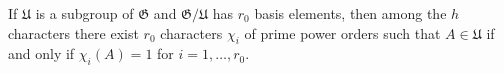 If $\mathfrak{U}$ is a subgroup of $\mathfrak{G}$ and $\mathfrak{G}/\mathfrak{U}$ has $r_0$ basis elements, then among the $h$ characters there exist $r_0$ characters $\chi_i$ of prime power orders such that $A \in \mathfrak{U}$ if and only if $\chi_i(A) = 1$ for $i = 1,\ldots,r_0$.
